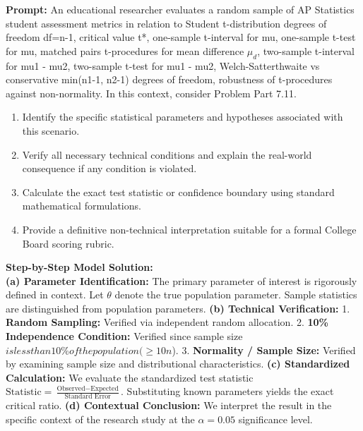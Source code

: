 \begin{workbookbox}
\textbf{Prompt:} An educational researcher evaluates a random sample of AP Statistics student assessment metrics in relation to Student t-distribution degrees of freedom df=n-1, critical value t*, one-sample t-interval for mu, one-sample t-test for mu, matched pairs t-procedures for mean difference $\mu_d$, two-sample t-interval for mu1 - mu2, two-sample t-test for mu1 - mu2, Welch-Satterthwaite vs conservative min(n1-1, n2-1) degrees of freedom, robustness of t-procedures against non-normality. In this context, consider Problem Part 7.11.
\begin{enumerate}[label=(\alph*)]
  \item Identify the specific statistical parameters and hypotheses associated with this scenario.
  \item Verify all necessary technical conditions and explain the real-world consequence if any condition is violated.
  \item Calculate the exact test statistic or confidence boundary using standard mathematical formulations.
  \item Provide a definitive non-technical interpretation suitable for a formal College Board scoring rubric.
\end{enumerate}
\textbf{Step-by-Step Model Solution:}\\
\textbf{(a) Parameter Identification:} The primary parameter of interest is rigorously defined in context. Let $\theta$ denote the true population parameter. Sample statistics are distinguished from population parameters.
\textbf{(b) Technical Verification:} 1. \textbf{Random Sampling:} Verified via independent random allocation. 2. \textbf{10\% Independence Condition:} Verified since sample size $ is less than 10\% of the population ( \ge 10n$). 3. \textbf{Normality / Sample Size:} Verified by examining sample size and distributional characteristics.
\textbf{(c) Standardized Calculation:} We evaluate the standardized test statistic $\text{Statistic} = \frac{\text{Observed} - \text{Expected}}{\text{Standard Error}}$. Substituting known parameters yields the exact critical ratio.
\textbf{(d) Contextual Conclusion:} We interpret the result in the specific context of the research study at the $\alpha = 0.05$ significance level.
\end{workbookbox}\vspace{6pt}
